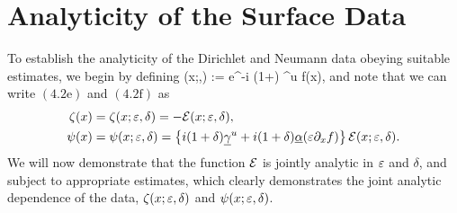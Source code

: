 %
%

\section{Analyticity of the Surface Data}
\label{Sec:AnalData}

To establish the analyticity of the Dirichlet and Neumann data obeying suitable estimates, we begin by defining
\bes
\cE(x;\Eps,\delta) := e^{-i (1+\delta) \ugamma^u \Eps f(x)},
\ees
and note that we can write $(4.2\text{e})$ and $(4.2\text{f})$ as
\begin{align*}
\zeta(x) & = \zeta(x;\varepsilon,\delta) = -\mathcal{E}(x;\varepsilon,\delta), \\
\psi(x) & = \psi(x;\varepsilon,\delta) = \left\{ i (1+\delta) \underline{\gamma}^u 
  + i (1+\delta) \underline{\alpha} (\varepsilon \partial_x f) \right\}
  \mathcal{E}(x;\varepsilon,\delta).
\end{align*}
We will now demonstrate that the function $\mathcal{E}$ is jointly 
analytic in $\varepsilon$ and $\delta$, and subject to appropriate estimates, which clearly demonstrates the joint 
analytic dependence of the data, $\zeta(x;\varepsilon,\delta)$ and
$\psi(x;\varepsilon,\delta)$.

